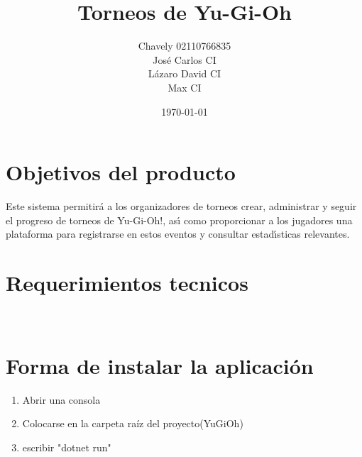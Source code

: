 \documentclass[a4paper]{article}
\begin{document}
\title{Torneos de Yu-Gi-Oh}
\author{
  \begin{tabular}{c}
    Chavely 02110766835 \\
    Jos\'e Carlos CI \\
    L\'azaro David CI \\
    Max CI
  \end{tabular}
}
\date{\today}
\maketitle
\newpage

\section{Objetivos del producto}
Este sistema permitirá a los organizadores de torneos crear, administrar y seguir el progreso de torneos de
Yu-Gi-Oh!, ası́ como proporcionar a los jugadores una plataforma para registrarse en estos eventos y consultar
estadı́sticas relevantes.

\newpage

\section{Requerimientos tecnicos}
\

\section{Forma de instalar la aplicaci\'on}
\begin{enumerate}
\item Abrir una consola
\item Colocarse en la carpeta ra\'iz del proyecto(YuGiOh)
\item escribir "dotnet run"
\end{enumerate}

\newpage
\end{document}
